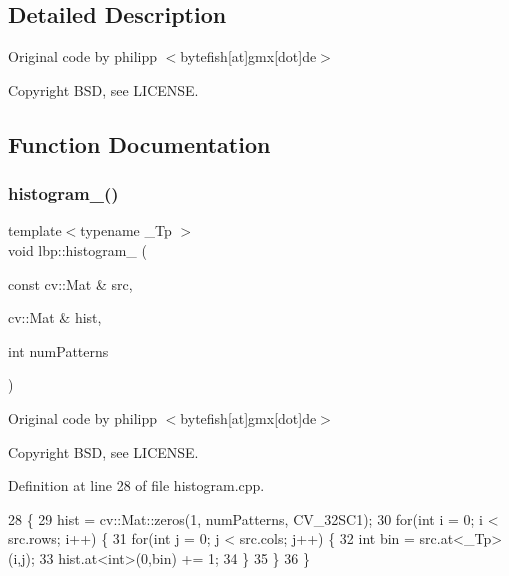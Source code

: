 \subsection{Detailed Description}
Original code by philipp $<$bytefish\mbox{[}at\mbox{]}gmx\mbox{[}dot\mbox{]}de$>$ 

\begin{DoxyCopyright}{Copyright}
B\+SD, see L\+I\+C\+E\+N\+SE. 
\end{DoxyCopyright}


\subsection{Function Documentation}
\mbox{\label{namespacelbp_a7a2d45fdc785282bc110d25495ef78d7}} 
\subsubsection{\texorpdfstring{histogram\+\_\+()}{histogram\_()}}
{\footnotesize\ttfamily template$<$typename \+\_\+\+Tp $>$ \\
void lbp\+::histogram\+\_\+ (\begin{DoxyParamCaption}\item[{const cv\+::\+Mat \&}]{src,  }\item[{cv\+::\+Mat \&}]{hist,  }\item[{int}]{num\+Patterns }\end{DoxyParamCaption})}



Original code by philipp $<$bytefish\mbox{[}at\mbox{]}gmx\mbox{[}dot\mbox{]}de$>$ 

\begin{DoxyCopyright}{Copyright}
B\+SD, see L\+I\+C\+E\+N\+SE. 
\end{DoxyCopyright}


Definition at line 28 of file histogram.\+cpp.


\begin{DoxyCode}
28                                                                    \{
29     hist = cv::Mat::zeros(1, numPatterns, CV\_32SC1);
30     \textcolor{keywordflow}{for}(\textcolor{keywordtype}{int} i = 0; i < src.rows; i++) \{
31         \textcolor{keywordflow}{for}(\textcolor{keywordtype}{int} j = 0; j < src.cols; j++) \{
32             \textcolor{keywordtype}{int} bin = src.at<\_Tp>(i,j);
33             hist.at<\textcolor{keywordtype}{int}>(0,bin) += 1;
34         \}
35     \}
36 \}
\end{DoxyCode}
\mbox{\label{namespacelbp_a640337219aa7c2a5326fa41af8269cc5}} 
